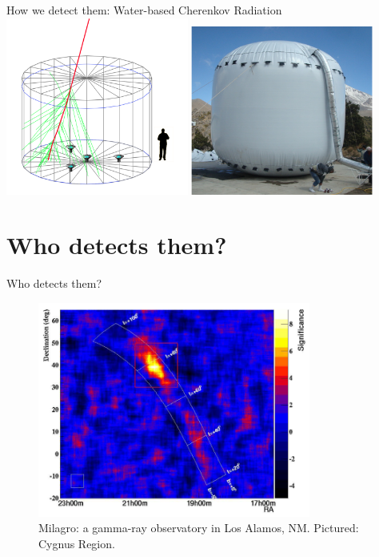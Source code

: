 \documentclass{beamer}
\begin{document}
\begin{frame}{How we detect them: Water-based Cherenkov Radiation}
\centering
\includegraphics[width=0.45\textwidth]{figures/hawc_3.png}
\includegraphics[width=0.45\textwidth]{figures/hawc_4.png}
\end{frame}

\section{Who detects them?}

\begin{frame}{Who detects them?}
\begin{figure}
\centering
\includegraphics[width=0.8\textwidth]{figures/milagro_1.png}
\caption{\label{fig:x1} Milagro: a gamma-ray observatory in Los Alamos, NM.  Pictured: Cygnus Region.}
\end{figure}
\end{frame}
\end{document}
